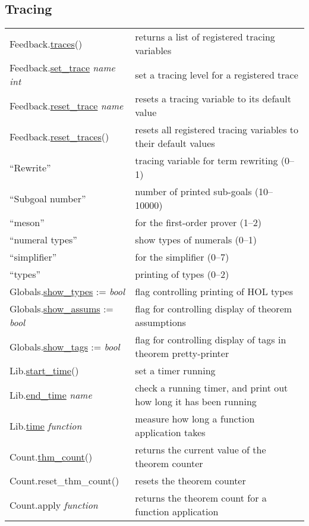 \documentclass[landscape,10pt]{article}
\newcommand{\hol}[2]{{\sffamily #1.\href{#1.#2.html}{#2}}}
\newcommand{\holnoref}[2]{{\sffamily #1.#2}}
\newcommand{\var}[1]{{\emph{#1}}}
\begin{document}
\begin{multicols}{2}
\subsection*{Tracing}
\begin{tabular}{ll}
\hol{Feedback}{traces}() & returns a list of registered tracing variables \\
\hol{Feedback}{set_trace} \var{name} \var{int} & set a tracing level for a registered trace \\
\hol{Feedback}{reset_trace} \var{name} & resets a tracing variable to its default value \\
\hol{Feedback}{reset_traces}() & resets all registered tracing variables to their default values \\[4pt]
\quad \textsf{``Rewrite''} & tracing variable for term rewriting (0--1) \\
\quad \textsf{``Subgoal number''} & number of printed sub-goals (10--10000) \\
\quad \textsf{``meson''} & for the first-order prover (1--2) \\
\quad \textsf{``numeral types''} & show types of numerals (0--1)\\
\quad \textsf{``simplifier''} & for the simplifier (0--7) \\
\quad \textsf{``types''} & printing of types (0--2) \\[4pt]
\hol{Globals}{show_types} := \var{bool} & flag controlling printing of
HOL types \\
\hol{Globals}{show_assums} := \var{bool} & flag for controlling
display of theorem assumptions\\
\hol{Globals}{show_tags} := \var{bool} & flag for controlling display of tags in theorem pretty-printer \\[4pt]
\hol{Lib}{start_time}() & set a timer running \\
\hol{Lib}{end_time} \var{name} & check a running timer, and print out how long it has been running \\
\hol{Lib}{time} \var{function} & measure how long a function application takes \\
\hol{Count}{thm_count}() & returns the current value of the theorem counter \\
\holnoref{Count}{reset_thm_count}() & resets the theorem counter \\
\holnoref{Count}{apply} \var{function} & returns the theorem count for a function application \\
\end{tabular}
\end{multicols}
\end{document}
